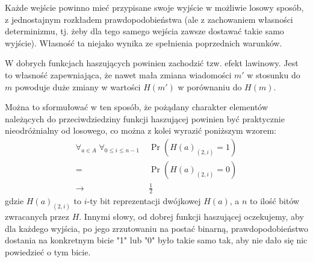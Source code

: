 \documentclass[12pt,a4paper,twoside]{article}
\begin{document}
Każde wejście powinno mieć przypisane swoje wyjście w możliwie losowy sposób, z
jednostajnym rozkładem prawdopodobieństwa (ale z zachowaniem własności
determinizmu, tj. żeby dla tego samego wejścia zawsze dostawać takie samo
wyjście). Własność ta niejako wynika ze spełnienia poprzednich warunków.

\label{sec:avalance_effect}

W dobrych funkcjach haszujących powinien zachodzić tzw. efekt lawinowy. Jest to
własność zapewniająca, że nawet mała zmiana wiadomości $m'$ w stosunku do $m$
powoduje duże zmiany w wartości $H(m')$ w porównaniu do $H(m)$.

Można to sformułować w ten sposób, że pożądany charakter elementów należących
do przeciwdziedziny funkcji haszującej powinien być praktycznie nieodróżnialny
od losowego, co można z kolei wyrazić poniższym wzorem:
$$
    \begin{aligned}
    \forall_{a \in A} \;
    \forall_{0 \leq i \leq n-1} \;
    &\Pr(H(a)_{(2,i)} = 1) \\
    =& \Pr(H(a)_{(2,i)} = 0) \\
    \to& \frac{1}{2}
    \end{aligned}
$$
gdzie $H(a)_{(2,i)}$ to $i$-ty bit reprezentacji dwójkowej $H(a)$, a $n$ to ilość
bitów zwracanych przez $H$. Innymi słowy, od dobrej funkcji haszującej
oczekujemy, aby dla każdego wyjścia, po jego zrzutowaniu na postać binarną,
prawdopodobieństwo dostania na konkretnym bicie "1" lub "0" było takie samo
tak, aby nie dało się nic powiedzieć o tym bicie.
\end{document}
